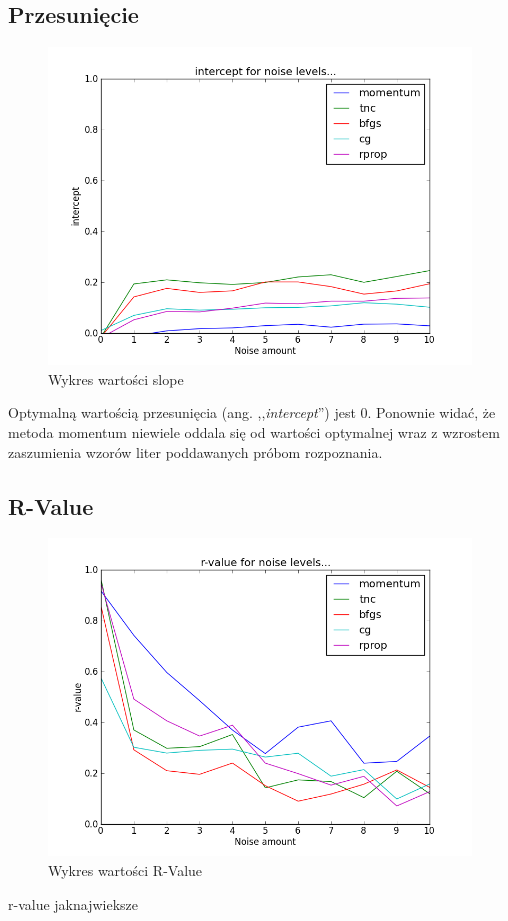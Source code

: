 \documentclass[a4paper]{article}
\begin{document}
\subsection{Przesunięcie}
\begin{figure}[pht]
 \centering
 \includegraphics[scale=0.5]{../compare_plots/compare_plot_intercept}
 \caption{Wykres wartości slope}\label{rys:plot1}
\end{figure}
Optymalną wartością przesunięcia (ang. ,,\textit{intercept}'') jest 0. Ponownie widać, że metoda momentum niewiele oddala się od
wartości optymalnej wraz z wzrostem zaszumienia wzorów liter poddawanych próbom rozpoznania.

\subsection{R-Value}
\begin{figure}[pht]
 \centering
 \includegraphics[scale=0.5]{../compare_plots/compare_plot_r_value}
 \caption{Wykres wartości R-Value}\label{rys:plot1}
\end{figure}
r-value jaknajwieksze
\end{document}
